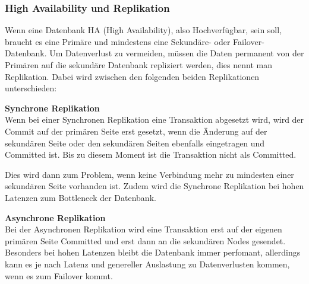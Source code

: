 
\subsubsection{High Availability und Replikation}
\begin{flushleft}
    Wenn eine Datenbank HA (High Availability), also Hochverfügbar, sein soll, braucht es eine Primäre und mindestens eine Sekundäre- oder \Gls{Failover}-Datenbank.
    Um Datenverlust zu vermeiden, müssen die Daten permanent von der Primären auf die sekundäre Datenbank repliziert werden, dies nennt man Replikation\cite{D9RDXENY}.
    Dabei wird zwischen den folgenden beiden Replikationen unterschieden:
\end{flushleft}
\begin{flushleft}
    \textbf{Synchrone Replikation}\\
    Wenn bei einer Synchronen Replikation eine Transaktion abgesetzt wird, wird der Commit auf der primären Seite erst gesetzt, wenn die Änderung auf der sekundären Seite oder den sekundären Seiten ebenfalls eingetragen und Committed ist.
    Bis zu diesem Moment ist die Transaktion nicht als Committed.

    Dies wird dann zum Problem, wenn keine Verbindung mehr zu mindesten einer sekundären Seite vorhanden ist.
    Zudem wird die Synchrone Replikation bei hohen Latenzen zum Bottleneck der Datenbank.
\end{flushleft}
\begin{flushleft}
    \textbf{Asynchrone Replikation}\\
    Bei der Asynchronen Replikation wird eine Transaktion erst auf der eigenen primären Seite Committed und erst dann an die sekundären Nodes gesendet.
    Besonders bei hohen Latenzen bleibt die Datenbank immer perfomant, allerdings kann es je nach Latenz und genereller Auslastung zu Datenverlusten kommen, wenn es zum \Gls{Failover} kommt.
\end{flushleft}